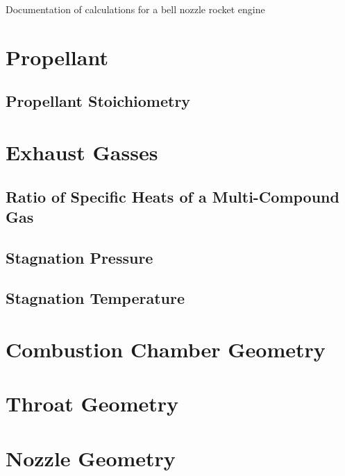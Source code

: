 \documentclass{article}
\begin{document}
Documentation of calculations for a bell nozzle rocket engine

\pagebreak

\section{Propellant}

\subsection{Propellant Stoichiometry}



\pagebreak
\section{Exhaust Gasses}

\subsection{Ratio of Specific Heats of a Multi-Compound Gas}



\subsection{Stagnation Pressure}



\subsection{Stagnation Temperature}


\pagebreak
\section{Combustion Chamber Geometry}

\pagebreak
\section{Throat Geometry}

\pagebreak
\section{Nozzle Geometry}
\end{document}
